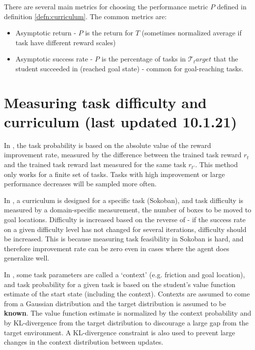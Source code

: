 \documentclass[letterpaper]{article}
\theoremstyle{definition}
\begin{document}
There are several main metrics for choosing the performance metric $P$ defined in definition \ref{defn:curriculum}.
The common metrics are:
\begin{itemize}
	\item Asymptotic return - $P$ is the return for $T$ (sometimes normalized average if task have different reward scales)
	\item Asymptotic success rate - $P$ is the percentage of tasks in $\mathcal{T}_target$ that the student succeeded in (reached goal state) - common for goal-reaching tasks.
\end{itemize}


\section{Measuring task difficulty and curriculum (last updated 10.1.21)} \label{sec:difficulty}

In \cite{Matiisen2020}, the task probability is based on the absolute value of the reward improvement rate, measured by the difference between the trained task reward $r_t$ and the trained task reward last measured for the same task $r_{t'}$.
This method only works for a finite set of tasks. Tasks with high improvement or large performance decreases will be sampled more often.

In \cite{Feng2020}, a curriculum is designed for a specific task (Sokoban), and task difficulty is measured by a domain-specific measurement, the number of boxes to be moved to goal locations. Difficulty is increased based on the reverse of \cite{Matiisen2020} - if the success rate on a given difficulty level has not changed for several iterations, difficulty should be increased. This is because measuring task feasibility in Sokoban is hard, and therefore improvement rate can be zero even in cases where the agent does generalize well.

In \cite{Klink2020}, some task parameters are called a `context' (e.g. friction and goal location), and task probability for a given task is based on the student's value function estimate of the start state (including the context).
Contexts are assumed to come from a Gaussian distribution and the target distribution is assumed to be \textbf{known}.
The value function estimate is normalized by the context probability and by KL-divergence from the target distribution to discourage a large gap from the target environment. A KL-divergence constraint is also used to prevent large changes in the context distribution between updates.
\end{document}
